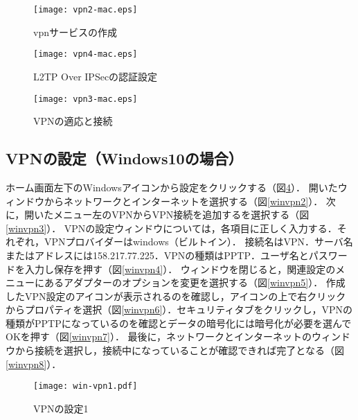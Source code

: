 \begin{figure}[htbp]
 \begin{center}
  \texttt{[image: vpn2-mac.eps]}
 \end{center}
 \caption{vpnサービスの作成}
 \label{Mvpn2}
\end{figure}

\begin{figure}[htbp]
 \begin{center}
  \texttt{[image: vpn4-mac.eps]}
 \end{center}
 \caption{ L2TP Over IPSecの認証設定}
 \label{Mvpn4}
\end{figure}

\begin{figure}[htbp]
 \begin{center}
  \texttt{[image: vpn3-mac.eps]}
 \end{center}
 \caption{VPNの適応と接続}
 \label{Mvpn3}
\end{figure}

\newpage
\subsection{VPNの設定（Windows10の場合）}
ホーム画面左下のWindowsアイコンから設定をクリックする（図\ref{winvpn1}）．
開いたウィンドウからネットワークとインターネットを選択する（図\ref{winvpn2}）．
次に，開いたメニュー左のVPNからVPN接続を追加するを選択する（図\ref{winvpn3}）．
VPNの設定ウィンドウについては，各項目に正しく入力する．それぞれ，VPNプロバイダーはwindows（ビルトイン）．
接続名はVPN．サーバ名またはアドレスには158.217.77.225．VPNの種類はPPTP．ユーザ名とパスワードを入力し保存を押す（図\ref{winvpn4}）．
ウィンドウを閉じると，関連設定のメニューにあるアダプターのオプションを変更を選択する（図\ref{winvpn5}）．
作成したVPN設定のアイコンが表示されるのを確認し，アイコンの上で右クリックからプロパティを選択（図\ref{winvpn6}）．セキュリティタブをクリックし，VPNの種類がPPTPになっているのを確認とデータの暗号化には暗号化が必要を選んでOKを押す（図\ref{winvpn7}）．
最後に，ネットワークとインターネットのウィンドウから接続を選択し，接続中になっていることが確認できれば完了となる（図\ref{winvpn8}）．

\begin{figure}[htbp]
 \begin{center}
  \texttt{[image: win-vpn1.pdf]}
 \end{center}
 \caption{VPNの設定1}
 \label{winvpn1}
\end{figure}

